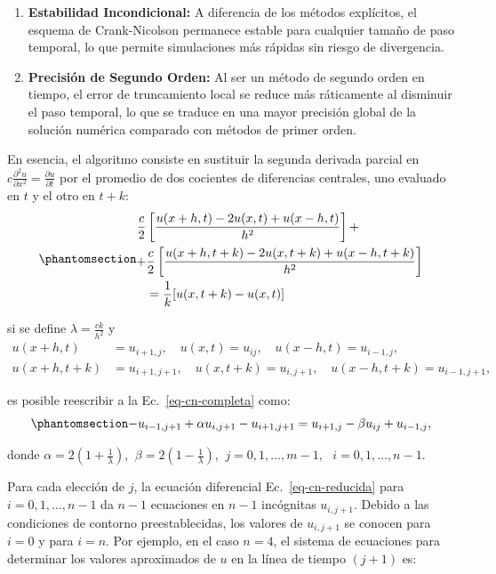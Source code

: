 \documentclass[
  spanish,
  us-letterpaper,
]{scrreprt}
\theoremstyle{definition}
\theoremstyle{plain}
\theoremstyle{remark}
\begin{document}
\begin{enumerate}
\def\labelenumi{\arabic{enumi}.}
\item
  \textbf{Estabilidad Incondicional:} A diferencia de los métodos
  explícitos, el esquema de Crank-Nicolson permanece estable para
  cualquier tamaño de paso temporal, lo que permite simulaciones más
  rápidas sin riesgo de divergencia.
\item
  \textbf{Precisión de Segundo Orden:} Al ser un método de segundo orden
  en tiempo, el error de truncamiento local se reduce más ráticamente al
  disminuir el paso temporal, lo que se traduce en una mayor precisión
  global de la solución numérica comparado con métodos de primer orden.
\end{enumerate}

En esencia, el algoritmo consiste en sustituir la segunda derivada
parcial en
\(c\frac{\partial^2 u}{\partial x^2} = \frac{\partial u}{\partial t}\)
por el promedio de dos cocientes de diferencias centrales, uno evaluado
en \(t\) y el otro en \(t+k\):
\begin{equation}\phantomsection\label{eq-cn-completa}{
\begin{split}
\dfrac{c}{2}& \left[\dfrac{u(x+h,t)-2u(x,t)+u(x-h,t)}{h^2}\right] + \\
    + &\dfrac{c}{2} \left[\dfrac{u(x+h,t+k)-2u(x,t+k)+u(x-h,t+k)}{h^2} \right] \\
            &= \dfrac{1}{k}[u(x,t+k)-u(x,t)]
\end{split}
}\end{equation}

si se define \(\lambda = \frac{ck}{h^2}\) y \[
\begin{split}
u(x+h,t) &=u_{i+1,j}, \quad u(x,t)=u_{ij}, \quad u(x-h,t)=u_{i-1,j}, \\
u(x+h,t+k) &=u_{i+1,j+1}, \quad u(x,t+k)=u_{i,j+1}, \quad u(x-h,t+k)=u_{i-1,j+1},
\end{split}
\]

es posible reescribir a la Ec.~\ref{eq-cn-completa} como:
\begin{equation}\phantomsection\label{eq-cn-reducida}{
-u_{i-1,j+1} + \alpha u_{i,j+1} - u_{i+1,j+1} = u_{i+1,j} - \beta u_{ij} + u_{i-1,j},
}\end{equation}

donde \(\alpha=2(1+\frac{1}{\lambda})\),
\(\ \beta=2(1-\frac{1}{\lambda})\),
\(\ j=0,1,\dots, m-1, \ \ \ i=0,1,\dots, n-1\).

Para cada elección de \(j\), la ecuación diferencial
Ec.~\ref{eq-cn-reducida} para \(i=0,1,\dots, n-1\) da \(n-1\) ecuaciones
en \(n-1\) incógnitas \(u_{i,j+1}\). Debido a las condiciones de
contorno preestablecidas, los valores de \(u_{i, j+1}\) se conocen para
\(i=0\) y para \(i=n\). Por ejemplo, en el caso \(n=4\), el sistema de
ecuaciones para determinar los valores aproximados de \(u\) en la línea
de tiempo \((j+1)\) es:
\end{document}
